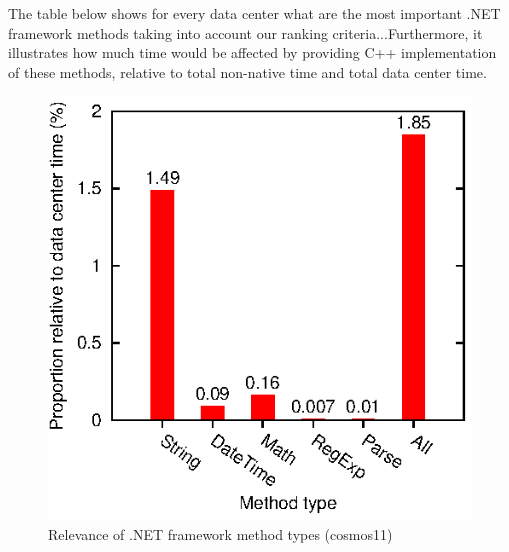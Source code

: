 The table below shows for every data center what are the most important .NET framework methods taking into account our ranking criteria...Furthermore, it illustrates how much time would be affected by providing C++ implementation of these methods, relative to total non-native time and total data center time.

\begin{figure}[ht]
\includegraphics{graphs/methodTypes}
\caption{Relevance of .NET framework method types (cosmos11)}
\label{fig:methodTypes}
\end{figure}








